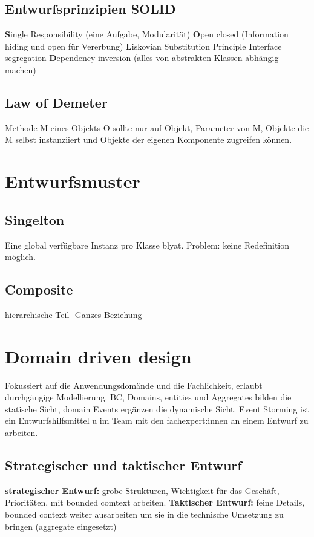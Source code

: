 \documentclass{book}
\begin{document}
    \subsection{Entwurfsprinzipien \textbf{ SOLID}}
    \textbf{S}ingle Responsibility (eine Aufgabe, Modularität)
    \newline
    \textbf{O}pen closed (Information hiding und open für Vererbung) \newline
    \textbf{L}iskovian Substitution Principle \newline
    \textbf{I}nterface segregation
    \newline
    \textbf{D}ependency inversion (alles von abstrakten Klassen abhängig machen)
    \subsection{Law of Demeter}
    Methode M eines Objekts O sollte nur auf Objekt, Parameter von M, Objekte die M selbst instanziiert und Objekte der eigenen Komponente zugreifen können.
    \section{Entwurfsmuster}
    \subsection{Singelton}
    Eine global verfügbare Instanz pro Klasse blyat.
    Problem: keine Redefinition möglich.
    \subsection{Composite}
    hierarchische Teil- Ganzes Beziehung

    \section{Domain driven design}
    Fokussiert auf die Anwendungsdomände und die Fachlichkeit, erlaubt durchgängige Modellierung.
    BC, Domains, entities und Aggregates bilden die statische Sicht, domain Events ergänzen die dynamische Sicht.
    Event Storming ist ein Entwurfshilfsmittel u im Team mit den fachexpert:innen an einem Entwurf zu arbeiten.
    \subsection{Strategischer und taktischer Entwurf}
    \textbf{strategischer Entwurf:} grobe Strukturen, Wichtigkeit für das Geschäft, Prioritäten, mit bounded comtext arbeiten.
    \newline
    \textbf{Taktischer Entwurf:} feine Details, bounded context weiter ausarbeiten um sie in die technische Umsetzung zu bringen (aggregate eingesetzt)
\end{document}
